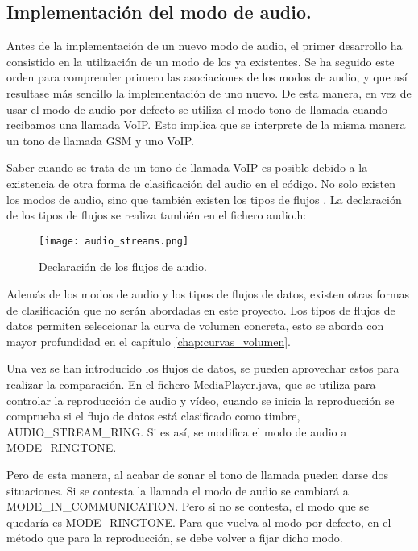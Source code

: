 \subsection{Implementación del modo de audio.}
Antes de la implementación de un nuevo modo de audio, el primer desarrollo ha consistido en la utilización de un modo de los ya existentes. Se ha seguido este orden para comprender primero las asociaciones de los modos de audio, y que así resultase más sencillo la implementación de uno nuevo. De esta manera, en vez de usar el modo de audio por defecto se utiliza el modo tono de llamada cuando recibamos una llamada \gls{VoIP}. Esto implica que se interprete de la misma manera un tono de llamada \gls{GSM} y uno \gls{VoIP}.

Saber cuando se trata de un tono de llamada \gls{VoIP} es posible debido a la existencia de otra forma de clasificación del audio en el código. No solo existen los modos de audio, sino que también existen los tipos de flujos \cite{audio_manager}. La declaración de los tipos de flujos se realiza también en el fichero audio.h:

\begin{figure}[H]
	\centering
	\texttt{[image: audio\_streams.png]}
	\caption{Declaración de los flujos de audio.}
	\label{fig:audio_streams}
\end{figure}

Además de los modos de audio y los tipos de flujos de datos, existen otras formas de clasificación que no serán abordadas en este proyecto. Los tipos de flujos de datos permiten seleccionar la curva de volumen concreta, esto se aborda con mayor profundidad en el capítulo \ref{chap:curvas_volumen}.

Una vez se han introducido los flujos de datos, se pueden aprovechar estos para realizar la comparación.  En el fichero MediaPlayer.java, que se utiliza para controlar la reproducción de audio y vídeo, cuando se inicia la reproducción se comprueba si el flujo de datos está clasificado como timbre, AUDIO\_STREAM\_RING. Si es así, se modifica el modo de audio a MODE\_RINGTONE.

Pero de esta manera, al acabar de sonar el tono de llamada pueden darse dos situaciones. Si se contesta la llamada el modo de audio se cambiará a \\ MODE\_IN\_COMMUNICATION. Pero si no se contesta, el modo que se quedaría es MODE\_RINGTONE. Para que vuelva al modo por defecto, en el método que para la reproducción, se debe volver a fijar dicho modo.

